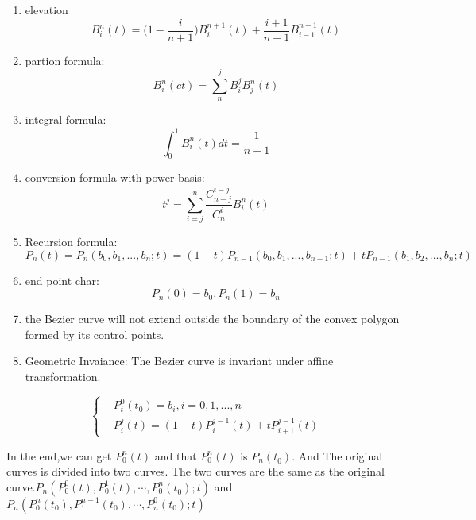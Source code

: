 \begin{property}
\begin{enumerate}
		\item elevation \begin{equation*}
			      B_{i}^{n}(t) = {(1 -\frac{i}{n+1}})B_{i}^{n+1}(t)+\frac{i+1}{n+1}B_{i-1}^{n+1}(t)
		      \end{equation*}
		\item partion formula:\begin{equation*}
			      B_{i}^{n}(ct) = \sum_{n}^{j}B_{i}^{j}B_{j}^{n}(t)
		      \end{equation*}

		\item integral formula:\begin{equation*}
			      \int_{0}^{1}B_{i}^{n}(t)dt = \frac{1}{n+1}
		      \end{equation*}
		\item conversion formula with power basis:\begin{equation*}
			      t^j = \sum_{i=j}^{n}\frac{C_{n-j}^{i-j}}{C_{n}^{i}}B_{i}^{n}(t)
		      \end{equation*}
		\item Recursion formula:\begin{equation*}
			      P_n(t) = P_n(b_0,b_1,...,b_n;t) = (1-t)P_{n-1}(b_0,b_1,...,b_{n-1};t)+tP_{n-1}(b_1,b_2,...,b_n;t)
		      \end{equation*}
		\item end point char:\begin{equation*}
			      P_n(0) = b_0,P_n(1) = b_n
		      \end{equation*}
		\item the Bezier curve will not extend outside the boundary of the convex polygon formed by its control points.
		\item Geometric Invaiance: The Bezier curve is invariant under affine transformation.

	\end{enumerate}
\end{property}

\begin{definition}
	\begin{equation*}
		\begin{cases}
			 & P_{t}^{0}(t_{0}) = b_{i},i = 0,1,...,n               \\
			 & P_{i}^{j}(t) = (1-t)P_{i}^{j-1}(t)+tP_{i+1}^{j-1}(t)
		\end{cases}
	\end{equation*}
	\label{def:de_casteljau_s_algorithm}
	\begin{remark}
		In the end,we can get $P_{0}^{n}(t)$ and that $P_{0}^{n}(t)$ is $P_{n}^{}(t_{0}^{})$. And The original curves is divided into two curves. The two curves are the same as the original curve.$P_{n}(P_{0}^{0}(t),P_{0}^{1}(t),\cdots,P_{0}^{n}(t_{0}^{});t)$ and $P_{n}(P_{0}^{n}(t_{0}),P_{1}^{n-1}(t_{0}),\cdots,P_{n}^{0}(t_0);t)$
	\end{remark}

\end{definition}

